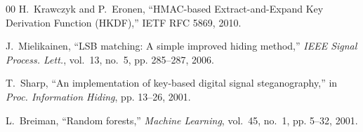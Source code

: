 \documentclass[conference]{IEEEtran}
\begin{document}
\begin{thebibliography}{00}
H.~Krawczyk and P.~Eronen, ``{HMAC}-based Extract-and-Expand Key Derivation Function ({HKDF}),'' IETF RFC 5869, 2010.

J.~Mielikainen, ``{LSB} matching: A simple improved hiding method,'' \emph{IEEE Signal Process. Lett.}, vol.~13, no.~5, pp. 285--287, 2006.

T.~Sharp, ``An implementation of key-based digital signal steganography,'' in \emph{Proc. Information Hiding}, pp. 13--26, 2001.

L.~Breiman, ``Random forests,'' \emph{Machine Learning}, vol.~45, no.~1, pp. 5--32, 2001.
\end{thebibliography}
\end{document}
